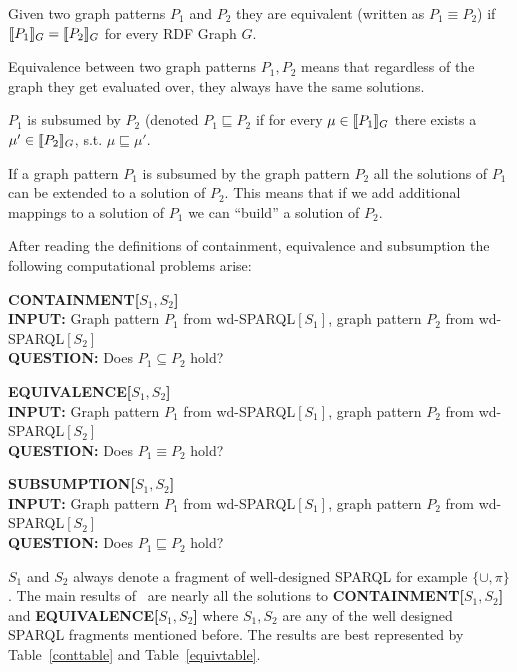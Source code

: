 \begin{definition}[Equivalence]
Given two graph patterns $P_1$ and $P_2$ they are equivalent (written as $P_1
\equiv P_2$) if $\llbracket P_1 \rrbracket_{G}  = \llbracket P_2 \rrbracket_{G} $ for every RDF Graph $G$.
\end{definition}
 Equivalence between two graph patterns $P_1,P_2$ means that regardless of the graph
 they get evaluated over, they always have the same solutions.

\begin{definition}[Subsumption]
\medskip\noindent $P_1$ is subsumed by $P_2$ (denoted $P_1 \sqsubseteq P_2$ if for every $\mu \in \llbracket P_1 \rrbracket_G$ there exists a $\mu' \in
\llbracket P_2 \rrbracket_G$, s.t. $\mu \sqsubseteq \mu'$. 
\end{definition}
If a graph pattern $P_1$ is subsumed by the graph pattern $P_2$ all the
solutions of $P_1$ can be extended to a solution of $P_2$. This means that if we
add additional mappings to a solution of $P_1$ we can ``build'' a solution of
$P_2$. 


\noindent After reading the definitions of containment, equivalence and
subsumption the following computational problems arise:\\
\begin{framed}\noindent \textbf{CONTAINMENT[$S_1,S_2$]}\\
	\textbf{INPUT:} Graph pattern $P_1$ from wd-SPARQL$[S_1]$,
		 graph pattern $P_2$ from wd-SPARQL$[S_2]$\\
		 \textbf{QUESTION:} Does $P_1 \subseteq P_2$ hold?
\end{framed}
\begin{framed}\noindent \textbf{EQUIVALENCE[$S_1,S_2$]}\\
	\textbf{INPUT:} Graph pattern $P_1$ from wd-SPARQL$[S_1]$,
		 graph pattern $P_2$ from wd-SPARQL$[S_2]$\\
		 \textbf{QUESTION:} Does $P_1 \equiv P_2$ hold?
\end{framed}
\begin{framed}\noindent \textbf{SUBSUMPTION[$S_1,S_2$]}\\
	\textbf{INPUT:} Graph pattern $P_1$ from wd-SPARQL$[S_1]$,
		 graph pattern $P_2$ from wd-SPARQL$[S_2]$\\
		 \textbf{QUESTION:} Does $P_1 \sqsubseteq P_2$ hold?
\end{framed}
$S_1$ and $S_2$ always denote a fragment of well-designed SPARQL for example
$\{\cup,\pi\}$. The main results of~\cite{pichler2014containment} are nearly all
the solutions to \textbf{CONTAINMENT[$S_1,S_2$]} and \textbf{EQUIVALENCE[$S_1,S_2$]} where $S_1,S_2$
are any of the well designed SPARQL fragments mentioned before.
The results are best represented by Table~\ref{conttable} and Table~\ref{equivtable}.


